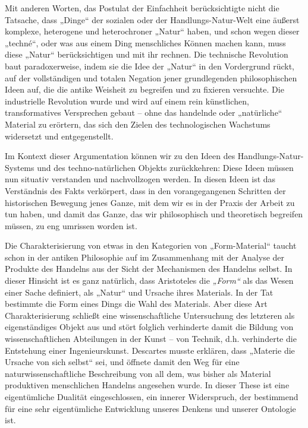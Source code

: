 \documentclass[11pt,a4paper]{article}
\begin{document}
Mit anderen Worten, das Postulat der Einfachheit berücksichtigte nicht die
Tatsache, dass „Dinge“ der sozialen oder der Handlungs-Natur-Welt eine äußerst
komplexe, heterogene und heterochroner „Natur“ haben, und schon wegen dieser
„techné“, oder was aus einem Ding menschliches Können machen kann, muss diese
„Natur“ berücksichtigen und mit ihr rechnen.  Die technische Revolution baut
paradoxerweise, indem sie die Idee der „Natur“ in den Vordergrund rückt, auf
der vollständigen und totalen Negation jener grundlegenden philosophischen
Ideen auf, die die antike Weisheit zu begreifen und zu fixieren versuchte.
Die industrielle Revolution wurde und wird auf einem rein künstlichen,
transformatives Versprechen gebaut -- ohne das handelnde oder „natürliche“
Material zu erörtern, das sich den Zielen des technologischen Wachstums
widersetzt und entgegenstellt.

Im Kontext dieser Argumentation können wir zu den Ideen des
Handlungs-Natur-Systems und des techno-natürlichen Objekts zurückkehren: Diese
Ideen müssen nun situativ verstanden und nachvollzogen werden. In diesen Ideen
ist das Verständnis des Fakts verkörpert, dass in den vorangegangenen
Schritten der historischen Bewegung jenes Ganze, mit dem wir es in der Praxis
der Arbeit zu tun haben, und damit das Ganze, das wir philosophisch und
theoretisch begreifen müssen, zu eng umrissen worden ist.

Die Charakterisierung von etwas in den Kategorien von „Form-Material“ taucht
schon in der antiken Philosophie auf im Zusammenhang mit der Analyse der
Produkte des Handelns aus der Sicht der Mechanismen des Handelns selbst. In
dieser Hinsicht ist es ganz natürlich, dass Aristoteles die \emph{„Form“} als
das Wesen einer Sache definiert, als „Natur“ und Ursache ihres Materials.  In
der Tat bestimmte die Form eines Dings die Wahl des Materials. Aber diese Art
Charakterisierung schließt eine wissenschaftliche Untersuchung des letzteren
als eigenständiges Objekt aus und stört folglich verhinderte damit die Bildung
von wissenschaftlichen Abteilungen in der Kunst -- von Technik,
d.h. verhinderte die Entstehung einer Ingenieurskunst.  Descartes musste
erklären, dass „Materie die Ursache von sich selbst“ sei, und öffnete damit
den Weg für eine naturwissenschaftliche Beschreibung von all dem, was bisher
als Material produktiven menschlichen Handelns angesehen wurde. In dieser
These ist eine eigentümliche Dualität eingeschlossen, ein innerer Widerspruch,
der bestimmend für eine sehr eigentümliche Entwicklung unseres Denkens und
unserer Ontologie ist.
\end{document}
